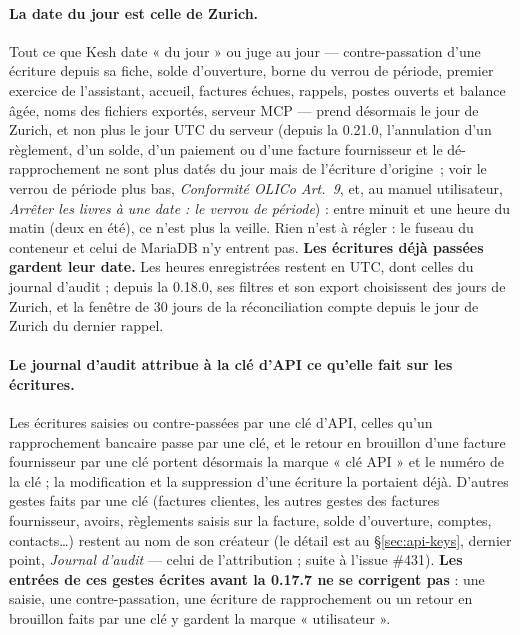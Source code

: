 \documentclass[a4paper,11pt,oneside]{article}
\begin{document}
\paragraph{La date du jour est celle de Zurich.} Tout ce que Kesh date « du jour » ou juge au jour --- contre-passation d'une écriture depuis sa fiche, solde d'ouverture, borne du verrou de période, premier exercice de l'assistant, accueil, factures échues, rappels, postes ouverts et balance âgée, noms des fichiers exportés, serveur MCP --- prend désormais le jour de Zurich, et non plus le jour UTC du serveur (depuis la 0.21.0, l'annulation d'un règlement, d'un solde, d'un paiement ou d'une facture fournisseur et le dé-rapprochement ne sont plus datés du jour mais de l'écriture d'origine~; voir le verrou de période plus bas, \emph{Conformité OLICo Art.~9}, et, au manuel utilisateur, \emph{Arrêter les livres à une date : le verrou de période}) : entre minuit et une heure du matin (deux en été), ce n'est plus la veille. Rien n'est à régler : le fuseau du conteneur et celui de MariaDB n'y entrent pas. \textbf{Les écritures déjà passées gardent leur date.} Les heures enregistrées restent en UTC, dont celles du journal d'audit ; depuis la 0.18.0, ses filtres et son export choisissent des jours de Zurich, et la fenêtre de 30 jours de la réconciliation compte depuis le jour de Zurich du dernier rappel.

\paragraph{Le journal d'audit attribue à la clé d'API ce qu'elle fait sur les écritures.} Les écritures saisies ou contre-passées par une clé d'API, celles qu'un rapprochement bancaire passe par une clé, et le retour en brouillon d'une facture fournisseur par une clé portent désormais la marque « clé API » et le numéro de la clé ; la modification et la suppression d'une écriture la portaient déjà. D'autres gestes faits par une clé (factures clientes, les autres gestes des factures fournisseur, avoirs, règlements saisis sur la facture, solde d'ouverture, comptes, contacts\ldots) restent au nom de son créateur (le détail est au \S\ref{sec:api-keys}, dernier point, \emph{Journal d'audit} --- celui de l'attribution ; suite à l'issue \#431). \textbf{Les entrées de ces gestes écrites avant la 0.17.7 ne se corrigent pas} : une saisie, une contre-passation, une écriture de rapprochement ou un retour en brouillon faits par une clé y gardent la marque « utilisateur ».
\end{document}
